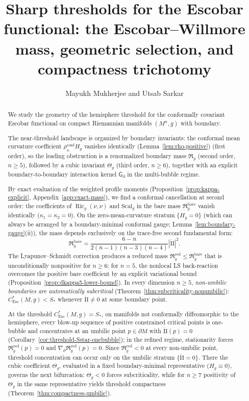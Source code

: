 \documentclass[11pt,reqno,a4paper]{amsart}
\title[The Escobar--Willmore Mass and Threshold Compactness]{Sharp thresholds for the Escobar functional:
the Escobar--Willmore mass, geometric selection, and compactness trichotomy}
\author{Mayukh Mukherjee and Utsab Sarkar}
\date{}
\numberwithin{equation}{section}
\theoremstyle{plain}
\newcommand{\Scal}{\mathrm{Scal}}
\newcommand{\Rr}{\mathfrak R_g^{\mathrm{red}}}
\theoremstyle{remark}
\theoremstyle{plain}
\begin{document}
\begin{abstract}
We study the geometry of the hemisphere threshold for the conformally covariant Escobar
functional on compact Riemannian manifolds $(M^n,g)$ with boundary.

The near-threshold landscape is organized by boundary invariants: the
conformal mean curvature coefficient $\rho_n^{\mathrm{conf}}H_g$ vanishes identically (Lemma~\ref{lem:rho-positive}) (first order),
so the leading obstruction is
a renormalized boundary mass $\mathfrak R_g$ (second order, $n\ge5$),
followed by a cubic invariant $\Theta_g$ (third order, $n\ge6$), together with an explicit
boundary-to-boundary interaction kernel $\mathsf G_\partial$ in the multi-bubble regime.

By exact evaluation of the weighted profile moments
(Proposition~\ref{prop:kappa-explicit}, Appendix~\ref{app:exact-mass}),
we find a conformal cancellation at second order: the coefficients of
$\operatorname{Ric}_g(\nu,\nu)$ and $\Scal_{\bar g}$ in the bare mass
$\mathfrak R_g^{\mathrm{bare}}$ vanish identically ($\kappa_1=\kappa_2=0$).
On the zero-mean-curvature stratum $\{H_g=0\}$
(which can always be arranged by a boundary-minimal conformal gauge;
Lemma~\ref{lem:boundary-gauge}(ii)),
the mass depends exclusively
on the trace-free second fundamental form:
\[
\mathfrak R_g^{\mathrm{bare}}
=\frac{6-n}{2(n-1)(n-3)(n-4)}|\mathring{\mathrm{II}}|^2.
\]
The Lyapunov--Schmidt correction produces a reduced mass
$\mathfrak R_g^{\mathrm{red}}\le\mathfrak R_g^{\mathrm{bare}}$
that is unconditionally nonpositive for $n\ge6$;
for $n=5$, the nonlocal LS back-reaction overcomes the positive bare coefficient
by an explicit variational bound (Proposition~\ref{prop:dkappa5-lower-bound}).
In every dimension $n\ge5$, \emph{non-umbilic boundaries are automatically subcritical}
(Theorem~\ref{thm:subcriticality-nonumbilic}): $C^*_{\mathrm{Esc}}(M,g)<S_\ast$
whenever $\mathring{\mathrm{II}}\neq 0$ at some boundary point.

At the threshold $C^*_{\mathrm{Esc}}(M,g)=S_\ast$, on manifolds not conformally
diffeomorphic to the hemisphere, every blow-up sequence of positive constrained
critical points is one-bubble and concentrates at an umbilic point
$p\in\partial M$ with $\mathring{\mathrm{II}}(p)=0$
(Corollary~\ref{cor:threshold-Sstar-onebubble});
in the refined regime, stationarity forces
$\Rr(p)=0$ and $\nabla_\partial \Rr(p)=0$.
Since $\Rr<0$ at every non-umbilic point, threshold concentration can occur
only on the umbilic stratum $\{\mathring{\mathrm{II}}=0\}$.
There the cubic coefficient $\Theta_g$, evaluated in a fixed
boundary-minimal representative ($H_g\equiv0$), governs the next bifurcation:
$\Theta_g<0$ forces subcriticality, while for $n\ge7$ positivity of $\Theta_g$
in the same representative yields threshold compactness
(Theorem~\ref{thm:compactness-umbilic}).


\end{abstract}
\end{document}
